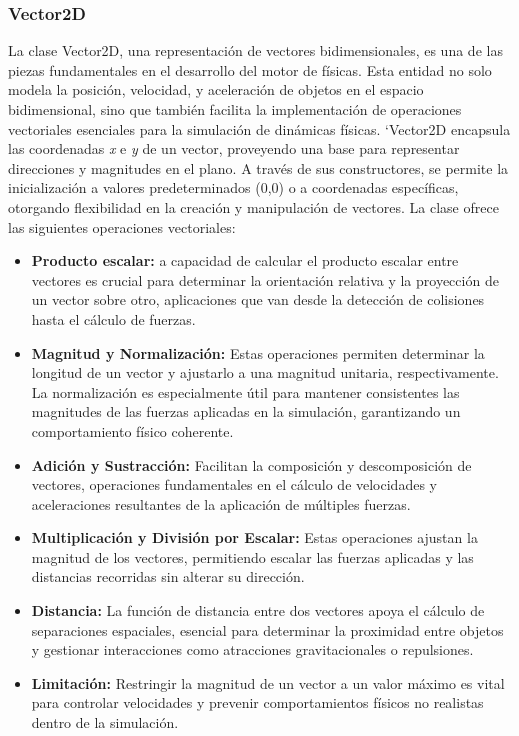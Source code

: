 \subsubsection{Vector2D}
La clase Vector2D, una representación de vectores bidimensionales, es una de las piezas fundamentales en el desarrollo del motor de físicas. Esta entidad no solo modela la posición, velocidad, y aceleración de objetos en el espacio bidimensional, sino que también facilita la implementación de operaciones vectoriales esenciales para la simulación de dinámicas físicas.
`Vector2D encapsula las coordenadas \textit{x} e \textit{y} de un vector, proveyendo una base para representar direcciones y magnitudes en el plano. A través de sus constructores, se permite la inicialización a valores predeterminados (0,0) o a coordenadas específicas, otorgando flexibilidad en la creación y manipulación de vectores.
La clase ofrece las siguientes operaciones vectoriales:
\begin{itemize}
    \item \textbf{Producto escalar:} a capacidad de calcular el producto escalar entre vectores es crucial para determinar la orientación relativa y la proyección de un vector sobre otro, aplicaciones que van desde la detección de colisiones hasta el cálculo de fuerzas.
    \item \textbf{Magnitud y Normalización:} Estas operaciones permiten determinar la longitud de un vector y ajustarlo a una magnitud unitaria, respectivamente. La normalización es especialmente útil para mantener consistentes las magnitudes de las fuerzas aplicadas en la simulación, garantizando un comportamiento físico coherente.
    \item \textbf{Adición y Sustracción:} Facilitan la composición y descomposición de vectores, operaciones fundamentales en el cálculo de velocidades y aceleraciones resultantes de la aplicación de múltiples fuerzas.
    \item \textbf{Multiplicación y División por Escalar:} Estas operaciones ajustan la magnitud de los vectores, permitiendo escalar las fuerzas aplicadas y las distancias recorridas sin alterar su dirección.
    \item \textbf{Distancia:} La función de distancia entre dos vectores apoya el cálculo de separaciones espaciales, esencial para determinar la proximidad entre objetos y gestionar interacciones como atracciones gravitacionales o repulsiones.
    \item \textbf{Limitación:} Restringir la magnitud de un vector a un valor máximo es vital para controlar velocidades y prevenir comportamientos físicos no realistas dentro de la simulación.
\end{itemize}
